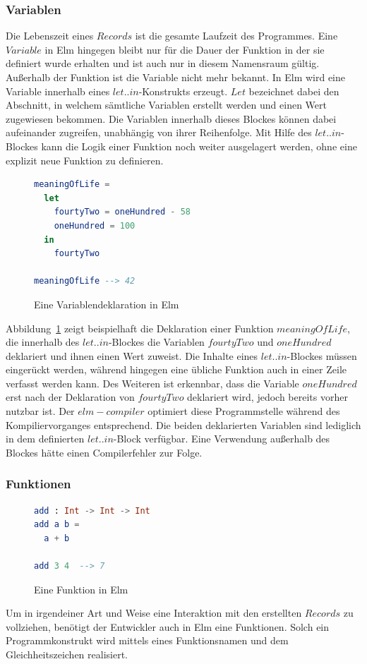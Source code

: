 \subsubsection{Variablen}
\label{sec:Variablen}
Die Lebenszeit eines $Records$ ist die gesamte Laufzeit des Programmes. Eine $Variable$ in Elm hingegen bleibt nur für die Dauer der Funktion in der sie definiert wurde erhalten und ist auch nur in diesem Namensraum gültig. Außerhalb der Funktion ist die Variable nicht mehr bekannt. In Elm wird eine Variable innerhalb eines $let..in$-Konstrukts erzeugt. $Let$ bezeichnet dabei den Abschnitt, in welchem sämtliche Variablen erstellt werden und einen Wert zugewiesen bekommen. Die Variablen innerhalb dieses Blockes können dabei aufeinander zugreifen, unabhängig von ihrer Reihenfolge. Mit Hilfe des $let..in$-Blockes kann die Logik einer Funktion noch weiter ausgelagert werden, ohne eine explizit neue Funktion zu definieren.
\begin{figure}[h]
\begin{lstlisting}[language=Elm]
meaningOfLife =
  let
    fourtyTwo = oneHundred - 58
    oneHundred = 100
  in
    fourtyTwo

meaningOfLife --> 42
\end{lstlisting}
\caption{Eine Variablendeklaration in Elm}\label{fig:elm-variables}
\end{figure}
Abbildung~\ref{fig:elm-variables} zeigt beispielhaft die Deklaration einer Funktion $meaningOfLife$, die innerhalb des $let..in$-Blockes die Variablen $fourtyTwo$ und $oneHundred$ deklariert und ihnen einen Wert zuweist. Die Inhalte eines $let..in$-Blockes müssen eingerückt werden, während hingegen eine übliche Funktion auch in einer Zeile verfasst werden kann. Des Weiteren ist erkennbar, dass die Variable $oneHundred$ erst nach der Deklaration von $fourtyTwo$ deklariert wird, jedoch bereits vorher nutzbar ist. Der $elm-compiler$ optimiert diese Programmstelle während des Kompiliervorganges entsprechend. Die beiden deklarierten Variablen sind lediglich in dem definierten $let..in$-Block verfügbar. Eine Verwendung außerhalb des Blockes hätte einen Compilerfehler zur Folge.

\subsubsection{Funktionen}
\label{sec:Funktionen}
\begin{figure}[h]
\begin{lstlisting}[language=Elm]
add : Int -> Int -> Int
add a b =
  a + b

add 3 4  --> 7
\end{lstlisting}
\caption{Eine Funktion in Elm}\label{fig:elm-function}
\end{figure}
Um in irgendeiner Art und Weise eine Interaktion mit den erstellten $Records$ zu vollziehen, benötigt der Entwickler auch in Elm eine Funktionen. Solch ein Programmkonstrukt wird mittels eines Funktionsnamen und dem Gleichheitszeichen realisiert.

